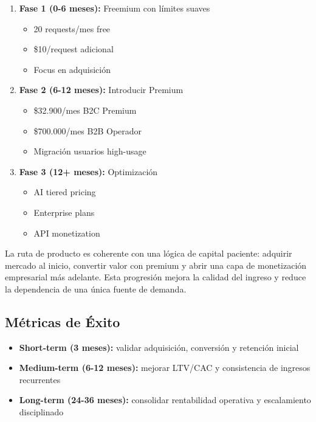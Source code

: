 \documentclass[12pt]{article}
\begin{document}
\begin{enumerate}
    \item \textbf{Fase 1 (0-6 meses):} Freemium con límites suaves
    \begin{itemize}
        \item 20 requests/mes free
        \item \$10/request adicional
        \item Focus en adquisición
    \end{itemize}
    \item \textbf{Fase 2 (6-12 meses):} Introducir Premium
    \begin{itemize}
        \item \$32.900/mes B2C Premium
        \item \$700.000/mes B2B Operador
        \item Migración usuarios high-usage
    \end{itemize}
    \item \textbf{Fase 3 (12+ meses):} Optimización
    \begin{itemize}
        \item AI tiered pricing
        \item Enterprise plans
        \item API monetization
    \end{itemize}
\end{enumerate}

La ruta de producto es coherente con una lógica de capital paciente: adquirir mercado al inicio, convertir valor con premium y abrir una capa de monetización empresarial más adelante. Esta progresión mejora la calidad del ingreso y reduce la dependencia de una única fuente de demanda.

\subsection{Métricas de Éxito}

\begin{itemize}
    \item \textbf{Short-term (3 meses):} validar adquisición, conversión y retención inicial
    \item \textbf{Medium-term (6-12 meses):} mejorar LTV/CAC y consistencia de ingresos recurrentes
    \item \textbf{Long-term (24-36 meses):} consolidar rentabilidad operativa y escalamiento disciplinado
\end{itemize}
\end{document}
